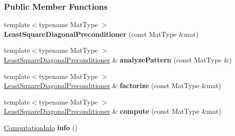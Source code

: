 \subsubsection*{Public Member Functions}
\begin{DoxyCompactItemize}
\item 
\mbox{\label{group___iterative_linear_solvers___module_a9fe093a3b038a1dc7628eced1aa00e39}} 
{\footnotesize template$<$typename Mat\+Type $>$ }\\{\bfseries Least\+Square\+Diagonal\+Preconditioner} (const Mat\+Type \&mat)
\item 
\mbox{\label{group___iterative_linear_solvers___module_af1d3a3dbe081bdb667a5596491d7ad47}} 
{\footnotesize template$<$typename Mat\+Type $>$ }\\\hyperlink{group___iterative_linear_solvers___module_class_eigen_1_1_least_square_diagonal_preconditioner}{Least\+Square\+Diagonal\+Preconditioner} \& {\bfseries analyze\+Pattern} (const Mat\+Type \&)
\item 
\mbox{\label{group___iterative_linear_solvers___module_a831492d2cecddc28b48ce53ddb4bc295}} 
{\footnotesize template$<$typename Mat\+Type $>$ }\\\hyperlink{group___iterative_linear_solvers___module_class_eigen_1_1_least_square_diagonal_preconditioner}{Least\+Square\+Diagonal\+Preconditioner} \& {\bfseries factorize} (const Mat\+Type \&mat)
\item 
\mbox{\label{group___iterative_linear_solvers___module_a05eb1d791e2265e9110ba3bb8d717cfe}} 
{\footnotesize template$<$typename Mat\+Type $>$ }\\\hyperlink{group___iterative_linear_solvers___module_class_eigen_1_1_least_square_diagonal_preconditioner}{Least\+Square\+Diagonal\+Preconditioner} \& {\bfseries compute} (const Mat\+Type \&mat)
\item 
\mbox{\label{group___iterative_linear_solvers___module_a648044dd59ff3b09cf4efa7fe49d5208}} 
\hyperlink{group__enums_ga85fad7b87587764e5cf6b513a9e0ee5e}{Computation\+Info} {\bfseries info} ()
\item 
\mbox{\label{group___iterative_linear_solvers___module_a9fe093a3b038a1dc7628eced1aa00e39}} 

\end{DoxyCompactItemize}
